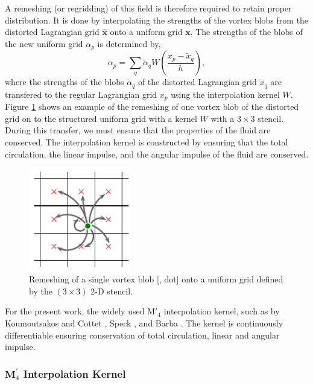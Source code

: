 A remeshing (or regridding) of this field is therefore required to retain proper distribution. It is done by interpolating the strengths of the vortex blobs from the distorted Lagrangian grid $\hat{\mathbf{x}}$ onto a uniform grid $\mathbf{x}$. The strengths of the blobs of the new uniform grid $\alpha_p$ is determined by,
	\begin{equation}
	\alpha_p = \sum_q\tilde{\alpha}_q W \left(\frac{x_p - \tilde{x}_q}{h}\right),
	\label{eq:la_remeshingKernel}
	\end{equation}
where the strengths of the blobs $\tilde{\alpha}_q$ of the distorted Lagrangian grid $\tilde{x}_q$ are transfered to the regular Lagrangian grid $x_p$ using the interpolation kernel $W$. Figure \ref{fig:interpolationGrid} shows an example of the remeshing of one vortex blob of the distorted grid on to the structured uniform grid with a kernel $W$ with a $3\times3$ stencil. During this transfer, we must ensure that the properties of the fluid are conserved. The interpolation kernel is constructed by ensuring that the total circulation, the linear impulse, and the angular impulse of the fluid are conserved. 

	\begin{figure}[H]
	\centering
	\includegraphics[width=0.4\textwidth]{figures/lagrangian/interpolationGrid.pdf}
	\caption{Remeshing of a single vortex blob [{\color{plotGreen}{$\bullet$}}, {} dot] onto a uniform grid defined by the $\left(3\times3\right)$ 2-D stencil.}
	\label{fig:interpolationGrid}
	\end{figure}

For the present work, the widely used $\mathrm{M}'_4$ interpolation kernel, such as by Koumoutsakos and Cottet \cite{Cottet2000a}, Speck \cite{Speck2011a}, and Barba \cite{Barba2004c}. The kernel is continuously differentiable ensuring conservation of total circulation, linear and angular impulse. 

\subsubsection*{$\mathbf{M}^\prime_4$ Interpolation Kernel}

